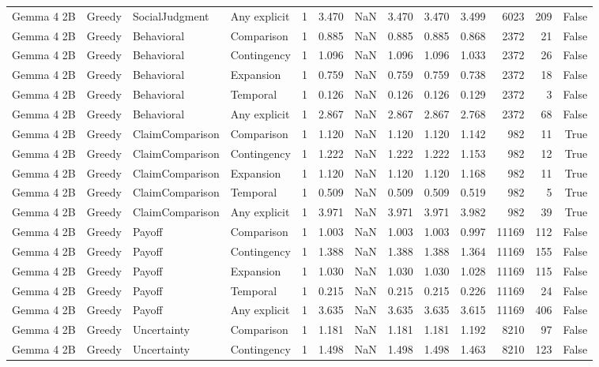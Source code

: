 \begin{tabular}{llllrrrrrrrrr}
Gemma 4 2B & Greedy & SocialJudgment & Any explicit & 1 & 3.470 & NaN & 3.470 & 3.470 & 3.499 & 6023 & 209 & False \\
Gemma 4 2B & Greedy & Behavioral & Comparison & 1 & 0.885 & NaN & 0.885 & 0.885 & 0.868 & 2372 & 21 & False \\
Gemma 4 2B & Greedy & Behavioral & Contingency & 1 & 1.096 & NaN & 1.096 & 1.096 & 1.033 & 2372 & 26 & False \\
Gemma 4 2B & Greedy & Behavioral & Expansion & 1 & 0.759 & NaN & 0.759 & 0.759 & 0.738 & 2372 & 18 & False \\
Gemma 4 2B & Greedy & Behavioral & Temporal & 1 & 0.126 & NaN & 0.126 & 0.126 & 0.129 & 2372 & 3 & False \\
Gemma 4 2B & Greedy & Behavioral & Any explicit & 1 & 2.867 & NaN & 2.867 & 2.867 & 2.768 & 2372 & 68 & False \\
Gemma 4 2B & Greedy & ClaimComparison & Comparison & 1 & 1.120 & NaN & 1.120 & 1.120 & 1.142 & 982 & 11 & True \\
Gemma 4 2B & Greedy & ClaimComparison & Contingency & 1 & 1.222 & NaN & 1.222 & 1.222 & 1.153 & 982 & 12 & True \\
Gemma 4 2B & Greedy & ClaimComparison & Expansion & 1 & 1.120 & NaN & 1.120 & 1.120 & 1.168 & 982 & 11 & True \\
Gemma 4 2B & Greedy & ClaimComparison & Temporal & 1 & 0.509 & NaN & 0.509 & 0.509 & 0.519 & 982 & 5 & True \\
Gemma 4 2B & Greedy & ClaimComparison & Any explicit & 1 & 3.971 & NaN & 3.971 & 3.971 & 3.982 & 982 & 39 & True \\
Gemma 4 2B & Greedy & Payoff & Comparison & 1 & 1.003 & NaN & 1.003 & 1.003 & 0.997 & 11169 & 112 & False \\
Gemma 4 2B & Greedy & Payoff & Contingency & 1 & 1.388 & NaN & 1.388 & 1.388 & 1.364 & 11169 & 155 & False \\
Gemma 4 2B & Greedy & Payoff & Expansion & 1 & 1.030 & NaN & 1.030 & 1.030 & 1.028 & 11169 & 115 & False \\
Gemma 4 2B & Greedy & Payoff & Temporal & 1 & 0.215 & NaN & 0.215 & 0.215 & 0.226 & 11169 & 24 & False \\
Gemma 4 2B & Greedy & Payoff & Any explicit & 1 & 3.635 & NaN & 3.635 & 3.635 & 3.615 & 11169 & 406 & False \\
Gemma 4 2B & Greedy & Uncertainty & Comparison & 1 & 1.181 & NaN & 1.181 & 1.181 & 1.192 & 8210 & 97 & False \\
Gemma 4 2B & Greedy & Uncertainty & Contingency & 1 & 1.498 & NaN & 1.498 & 1.498 & 1.463 & 8210 & 123 & False \\

\end{tabular}
